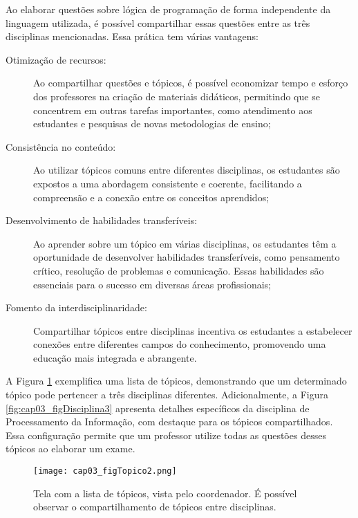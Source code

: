 Ao elaborar questões sobre lógica de programação de forma independente da linguagem utilizada, é possível compartilhar essas questões entre as três disciplinas mencionadas. Essa prática tem várias vantagens:

\begin{description}
\item[Otimização de recursos:] Ao compartilhar questões e tópicos, é possível economizar tempo e esforço dos professores na criação de materiais didáticos, permitindo que se concentrem em outras tarefas importantes, como atendimento aos estudantes e pesquisas de novas metodologias de ensino;

\item[Consistência no conteúdo:] Ao utilizar tópicos comuns entre diferentes disciplinas, os estudantes são expostos a uma abordagem consistente e coerente, facilitando a compreensão e a conexão entre os conceitos aprendidos;

\item[Desenvolvimento de habilidades transferíveis:] Ao aprender sobre um tópico em várias disciplinas, os estudantes têm a oportunidade de desenvolver habilidades transferíveis, como pensamento crítico, resolução de problemas e comunicação. Essas habilidades são essenciais para o sucesso em diversas áreas profissionais;

\item[Fomento da interdisciplinaridade:] Compartilhar tópicos entre disciplinas incentiva os estudantes a estabelecer conexões entre diferentes campos do conhecimento, promovendo uma educação mais integrada e abrangente.
\end{description}

A Figura \ref{fig:cap03_figTopico2} exemplifica uma lista de tópicos, demonstrando que um determinado tópico pode pertencer a três disciplinas diferentes. Adicionalmente, a Figura \ref{fig:cap03_figDisciplina3} apresenta detalhes específicos da disciplina de Processamento da Informação, com destaque para os tópicos compartilhados. Essa configuração permite que um professor utilize todas as questões desses tópicos ao elaborar um exame.

\begin{figure}[!ht]
  \centering
  \texttt{[image: cap03\_figTopico2.png]}
  \caption{Tela com a lista de tópicos, vista pelo  coordenador. É possível observar o compartilhamento de tópicos entre disciplinas.}
  \label{fig:cap03_figTopico2}
\end{figure}

